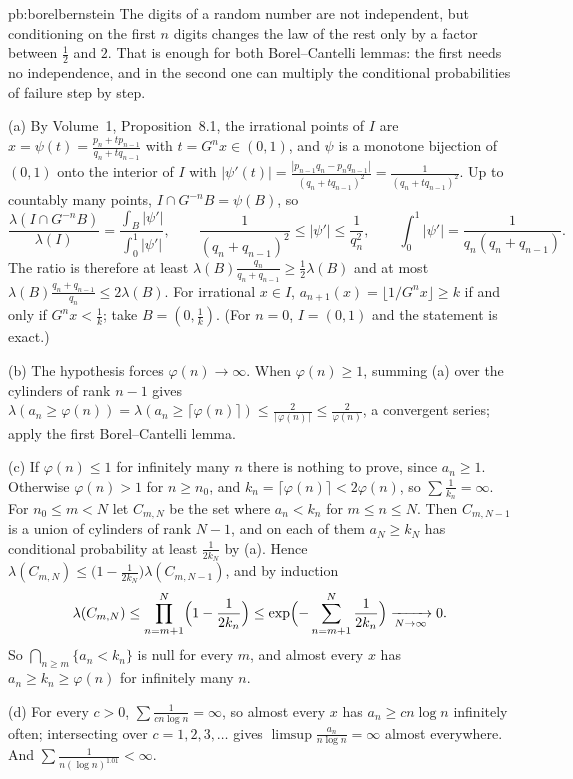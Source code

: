 \begin{solution}{pb:borelbernstein}
\idea The digits of a random number are not independent, but conditioning on the first $n$ digits changes the law of the rest only by a factor between
$\frac12$ and $2$. That is enough for both Borel--Cantelli lemmas: the first needs no independence, and in the second one can multiply the conditional
probabilities of failure step by step.

\writeup (a) By Volume~1, Proposition~8.1, the irrational points of $I$ are $x=\psi(t)=\frac{p_n+tp_{n-1}}{q_n+tq_{n-1}}$ with $t=G^nx\in(0,1)$, and $\psi$ is a
monotone bijection of $(0,1)$ onto the interior of $I$ with $|\psi'(t)|=\frac{|p_{n-1}q_n-p_nq_{n-1}|}{(q_n+tq_{n-1})^2}=\frac1{(q_n+tq_{n-1})^2}$. Up to countably many
points, $I\cap G^{-n}B=\psi(B)$, so
\[
\frac{\lambda(I\cap G^{-n}B)}{\lambda(I)}=\frac{\int_B|\psi'|}{\int_0^1|\psi'|},\qquad\frac1{(q_n+q_{n-1})^2}\le|\psi'|\le\frac1{q_n^2},\qquad\int_0^1|\psi'|=\frac1{q_n(q_n+q_{n-1})}.
\]
The ratio is therefore at least $\lambda(B)\frac{q_n}{q_n+q_{n-1}}\ge\frac12\lambda(B)$ and at most $\lambda(B)\frac{q_n+q_{n-1}}{q_n}\le2\lambda(B)$. For irrational
$x\in I$, $a_{n+1}(x)=\lfloor1/G^nx\rfloor\ge k$ if and only if $G^nx<\frac1k$; take $B=(0,\frac1k)$. (For $n=0$, $I=(0,1)$ and the statement is exact.)

(b) The hypothesis forces $\varphi(n)\to\infty$. When $\varphi(n)\ge1$, summing (a) over the cylinders of rank $n-1$ gives
$\lambda(a_n\ge\varphi(n))=\lambda(a_n\ge\lceil\varphi(n)\rceil)\le\frac2{\lceil\varphi(n)\rceil}\le\frac2{\varphi(n)}$, a convergent series; apply the first
Borel--Cantelli lemma.

(c) If $\varphi(n)\le1$ for infinitely many $n$ there is nothing to prove, since $a_n\ge1$. Otherwise $\varphi(n)>1$ for $n\ge n_0$, and $k_n=\lceil\varphi(n)\rceil<2\varphi(n)$,
so $\sum\frac1{k_n}=\infty$. For $n_0\le m<N$ let $C_{m,N}$ be the set where $a_n<k_n$ for $m\le n\le N$. Then $C_{m,N-1}$ is a union of cylinders of rank $N-1$, and on each
of them $a_N\ge k_N$ has conditional probability at least $\frac1{2k_N}$ by (a). Hence $\lambda(C_{m,N})\le\bigl(1-\frac1{2k_N}\bigr)\lambda(C_{m,N-1})$, and by induction
\[
\lambda(C_{m,N})\le\prod_{n=m+1}^N\Bigl(1-\frac1{2k_n}\Bigr)\le\exp\Bigl(-\sum_{n=m+1}^N\frac1{2k_n}\Bigr)\xrightarrow[N\to\infty]{}0.
\]
So $\bigcap_{n\ge m}\{a_n<k_n\}$ is null for every $m$, and almost every $x$ has $a_n\ge k_n\ge\varphi(n)$ for infinitely many $n$.

(d) For every $c>0$, $\sum\frac1{cn\log n}=\infty$, so almost every $x$ has $a_n\ge cn\log n$ infinitely often; intersecting over $c=1,2,3,\dots$ gives
$\limsup\frac{a_n}{n\log n}=\infty$ almost everywhere. And $\sum\frac1{n(\log n)^{1.01}}<\infty$.


\end{solution}
